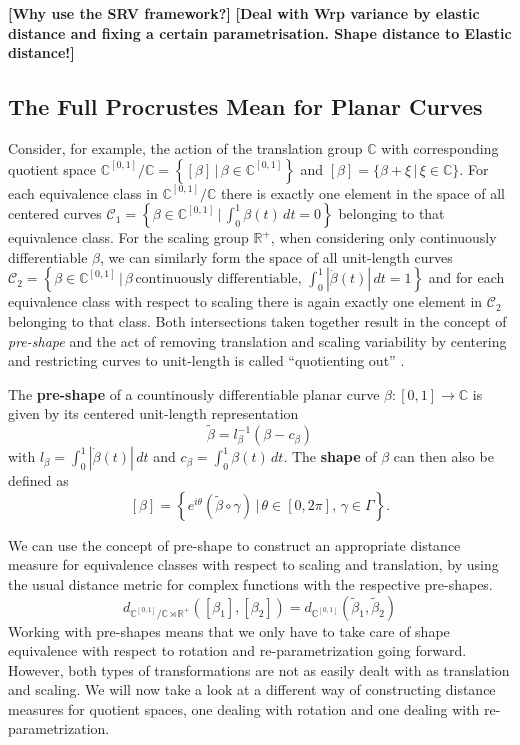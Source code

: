 \textbf{[Why use the SRV framework?]}
\textbf{[Deal with Wrp variance by elastic distance and fixing a certain parametrisation. Shape distance to Elastic distance!]}

\subsection{The Full Procrustes Mean for Planar Curves}
\label{theo:proc}
Consider, for example, the action of the translation group $\mathbb{C}$
with corresponding quotient space $\mathbb{C}^{[0,1]} \big/ \mathbb{C} =
\left\{[\beta] \,|\, \beta \in \mathbb{C}^{[0,1]} \right\}$ and $[\beta] =
\{\beta + \xi\,|\, \xi \in \mathbb{C}\}$.
For each equivalence class in $\mathbb{C}^{[0,1]} \big/ \mathbb{C}$ there is
exactly one element in the space of all centered curves $\mathcal{C}_1 =
\left\{ \beta \in \mathbb{C}^{[0,1]}\,\big|\, \int_0^1 \beta(t) \, dt = 0
\right\}$ belonging to that equivalence class.
For the scaling group $\mathbb{R}^+$, when considering only continuously
differentiable $\beta$, we can similarly form the space of all unit-length
curves $\mathcal{C}_2 = \left\{\beta \in \mathbb{C}^{[0,1]}\,\big|\,
\beta\,\text{continuously differentiable},\, \int_0^1 |\dot{\beta}(t)| \, dt =
1 \right\}$ and for each equivalence class with respect to scaling there is
again exactly one element in $\mathcal{C}_2$ belonging to that class.
Both intersections taken together result in the concept of \textit{pre-shape}
and the act of removing translation and scaling variability by centering and
restricting curves to unit-length is called \enquote{quotienting out} \parencite[see][133\,f.]{SrivastavaKlassen2016}.
\begin{definition}
  The \textbf{pre-shape} of a countinously differentiable planar curve $\beta :
  [0,1] \rightarrow \mathbb{C}$ is given by its centered unit-length
  representation 
  $$\tilde\beta = l_\beta^{-1} \left(\beta - c_\beta\right)$$
  with $l_\beta = \int_0^1|\dot\beta(t)|\,dt$ and $c_\beta = \int_0^1
  \beta(t)\,dt$.
  The \textbf{shape} of $\beta$ can then also be defined as
  $$[\beta] = \left\{e^{i\theta}(\tilde\beta \circ \gamma) \,\big|\, \theta \in
  [0,2\pi],\, \gamma \in \Gamma\right\}.$$
\end{definition}
\noindent We can use the concept of pre-shape to construct an appropriate distance
measure for equivalence classes with respect to scaling and translation, by
using the usual distance metric for complex functions with the respective
pre-shapes.
$$d_{\mathbb{C}^{[0,1]} \big/ \mathbb{C} \rtimes
\mathbb{R}^+}([\beta_1], [\beta_2]) = d_{\mathbb{C}^{[0,1]}}(\tilde\beta_1,
\tilde\beta_2)$$
\noindent Working with pre-shapes means that we only have to take care of shape
equivalence with respect to rotation and re-parametrization going forward.
However, both types of transformations are not as easily dealt with as
translation and scaling.
We will now take a look at a different way of constructing distance measures
for quotient spaces, one dealing with rotation and one dealing with
re-parametrization.

